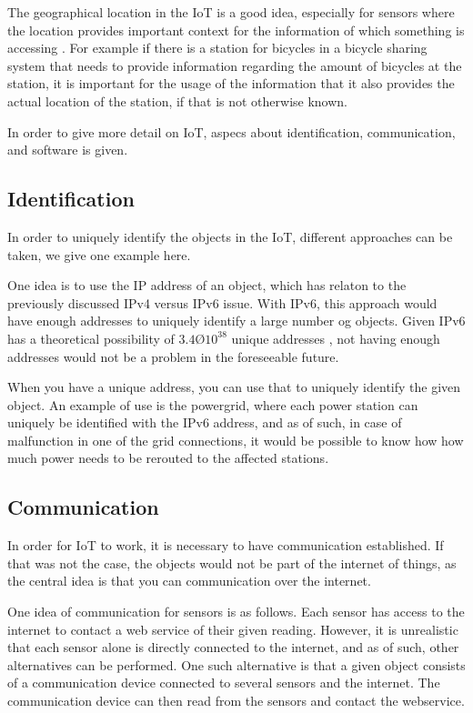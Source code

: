 The geographical location in the IoT is a good idea, especially for sensors where the location provides important context for the information of which something is accessing \citep{misc:locationMatters}.
For example if there is a station for bicycles in a bicycle sharing system that needs to provide information regarding the amount of bicycles at the station, it is important for the usage of the information that it also provides the actual location of the station, if that is not otherwise known.

In order to give more detail on IoT, aspecs about identification, communication, and software is given.

\subsection{Identification}
In order to uniquely identify the objects in the IoT, different approaches can be taken, we give one example here.

One idea is to use the IP address of an object, which has relaton to the previously discussed IPv4 versus IPv6 issue.
With IPv6, this approach would have enough addresses to uniquely identify a large number og objects.
Given IPv6 has a theoretical possibility of $3.4 Ø 10^38$ unique addresses \citep{misc:ipv6}, not having enough addresses would not be a problem in the foreseeable future.

When you have a unique address, you can use that to uniquely identify the given object.
An example of use is the powergrid, where each power station can uniquely be identified with the IPv6 address, and as of such, in case of malfunction in one of the grid connections, it would be possible to know how how much power needs to be rerouted to the affected stations.

\subsection{Communication}
In order for IoT to work, it is necessary to have communication established.
If that was not the case, the objects would not be part of the internet of things, as the central idea is that you can communication over the internet.

One idea of communication for sensors is as follows.
Each sensor has access to the internet to contact a web service of their given reading.
However, it is unrealistic that each sensor alone is directly connected to the internet, and as of such, other alternatives can be performed.
One such alternative is that a given object consists of a communication device connected to several sensors and the internet.
The communication device can then read from the sensors and contact the webservice.

